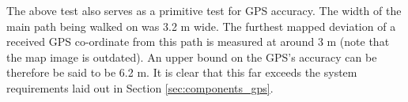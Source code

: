 The above test also serves as a primitive test for GPS accuracy. The width of the main path being walked on was 3.2 m wide. The furthest mapped deviation of a received GPS co-ordinate from this path is measured at around 3 m (note that the map image is outdated). An upper bound on the GPS's accuracy can be therefore be said to be 6.2 m. It is clear that this far exceeds the system requirements laid out in Section \ref{sec:components_gps}.